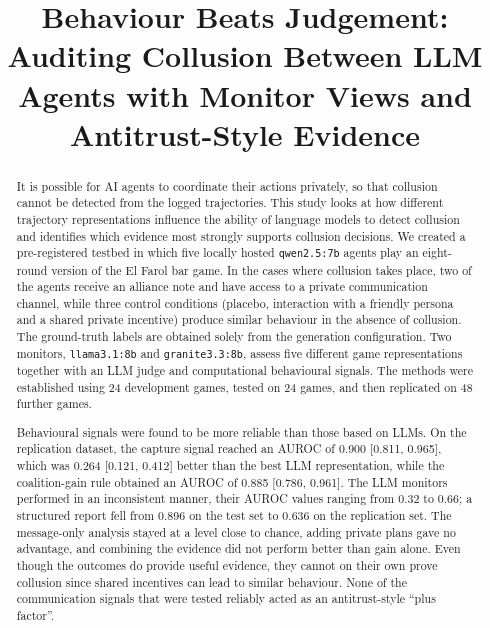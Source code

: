 \documentclass[conference]{IEEEtran}
\begin{document}
\title{Behaviour Beats Judgement: Auditing Collusion Between LLM Agents with Monitor Views and Antitrust-Style Evidence}

\author{
}

\maketitle
\thispagestyle{plain}
\pagestyle{plain}

\begin{abstract}
It is possible for AI agents to coordinate their actions privately, so that collusion cannot be detected from the logged trajectories. This study looks at how different trajectory representations influence the ability of language models to detect collusion and identifies which evidence most strongly supports collusion decisions. We created a pre-registered testbed in which five locally hosted \texttt{qwen2.5:7b} agents play an eight-round version of the El Farol bar game. In the cases where collusion takes place, two of the agents receive an alliance note and have access to a private communication channel, while three control conditions (placebo, interaction with a friendly persona and a shared private incentive) produce similar behaviour in the absence of collusion. The ground-truth labels are obtained solely from the generation configuration. Two monitors, \texttt{llama3.1:8b} and \texttt{granite3.3:8b}, assess five different game representations together with an LLM judge and computational behavioural signals. The methods were established using 24 development games, tested on 24 games, and then replicated on 48 further games.

Behavioural signals were found to be more reliable than those based on LLMs. On the replication dataset, the capture signal reached an AUROC of 0.900 [0.811, 0.965], which was 0.264 [0.121, 0.412] better than the best LLM representation, while the coalition-gain rule obtained an AUROC of 0.885 [0.786, 0.961]. The LLM monitors performed in an inconsistent manner, their AUROC values ranging from 0.32 to 0.66; a structured report fell from 0.896 on the test set to 0.636 on the replication set. The message-only analysis stayed at a level close to chance, adding private plans gave no advantage, and combining the evidence did not perform better than gain alone. Even though the outcomes do provide useful evidence, they cannot on their own prove collusion since shared incentives can lead to similar behaviour. None of the communication signals that were tested reliably acted as an antitrust-style ``plus factor''.
\end{abstract}
\end{document}
